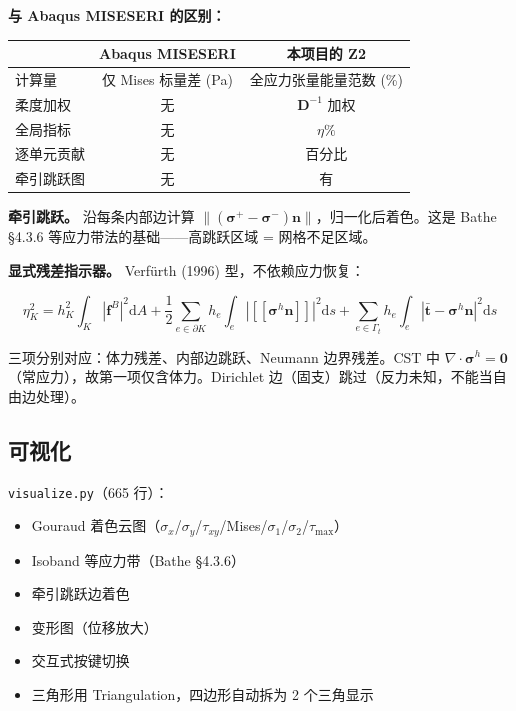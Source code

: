\documentclass[12pt,a4paper]{ctexart}
\begin{document}
\textbf{与 Abaqus MISESERI 的区别：}

\begin{center}
\begin{tabular}{lcc}
\hline
& \textbf{Abaqus MISESERI} & \textbf{本项目的 Z2} \\
\hline
计算量 & 仅 Mises 标量差 (Pa) & 全应力张量能量范数 (\%) \\
柔度加权 & 无 & $\mathbf{D}^{-1}$ 加权 \\
全局指标 & 无 & $\eta\%$ \\
逐单元贡献 & 无 & 百分比 \\
牵引跳跃图 & 无 & 有 \\
\hline
\end{tabular}
\end{center}

\textbf{牵引跳跃。} 沿每条内部边计算 $\|(\bm{\sigma}^+ - \bm{\sigma}^-)\mathbf{n}\|$，归一化后着色。这是 Bathe \S4.3.6 等应力带法的基础——高跳跃区域 = 网格不足区域。

\textbf{显式残差指示器。} Verfürth (1996) 型，不依赖应力恢复：

\begin{equation}\label{eq:explicit}
\eta_K^2 = h_K^2\int_K |\mathbf{f}^B|^2\mathrm{d}A
+ \frac{1}{2}\sum_{e\in\partial K} h_e\int_e |[\![\bm{\sigma}^h\mathbf{n}]\!]|^2\mathrm{d}s
+ \sum_{e\in\Gamma_t} h_e\int_e |\bar{\mathbf{t}} - \bm{\sigma}^h\mathbf{n}|^2\mathrm{d}s
\end{equation}

三项分别对应：体力残差、内部边跳跃、Neumann 边界残差。CST 中 $\nabla\cdot\bm{\sigma}^h = \mathbf{0}$（常应力），故第一项仅含体力。Dirichlet 边（固支）跳过（反力未知，不能当自由边处理）。

\subsection{可视化}

\texttt{visualize.py}（665 行）：
\begin{itemize}
  \item Gouraud 着色云图（$\sigma_x$/$\sigma_y$/$\tau_{xy}$/Mises/$\sigma_1$/$\sigma_2$/$\tau_{\max}$）
  \item Isoband 等应力带（Bathe \S4.3.6）
  \item 牵引跳跃边着色
  \item 变形图（位移放大）
  \item 交互式按键切换
  \item 三角形用 Triangulation，四边形自动拆为 2 个三角显示
\end{itemize}
\end{document}
